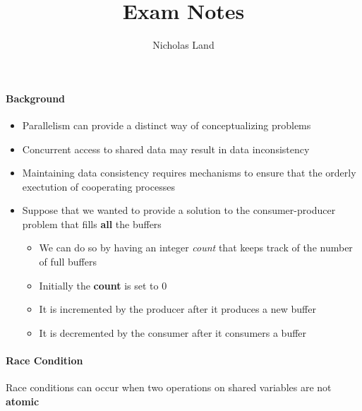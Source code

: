 \documentclass[titlepage]{article}
\title{Exam Notes}
\author{Nicholas Land}
\date{\formatdate{23}{02}{2016}}
\newcommand*{\redbold}[1]{\textbf{{\color{red} #1}}}
\newcommand*{\redit}[1]{\textit{{\color{red} #1}}}
\begin{document}
  \maketitle



  \paragraph{Background}

  \begin{itemize}
    \item Parallelism can provide a distinct way of conceptualizing problems
    \item Concurrent access to shared data may result in data inconsistency
    \item Maintaining data consistency requires mechanisms to ensure that the orderly exectution of cooperating processes
    \item Suppose that we wanted to provide a solution to the consumer-producer problem that fills \redbold{all} the buffers

    \begin{itemize}
      \item We can do so by having an integer \redit{count} that keeps track of the number of full buffers
      \item Initially the \redbold{count} is set to $0$
      \item It is incremented by the producer after it produces a new buffer
      \item It is decremented by the consumer after it consumers a buffer
    \end{itemize}
  \end{itemize}

  \paragraph{Race Condition}

  Race conditions can occur when two operations on shared variables are not \textbf{atomic}
\end{document}
